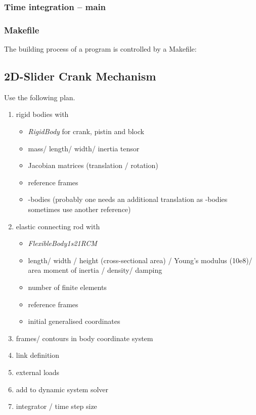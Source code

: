 \subsubsection{Time integration -- main}


\subsubsection{Makefile} \enlargethispage{5mm}
The building process of a program is controlled by a Makefile:

\subsection{2D-Slider Crank Mechanism}
Use the following plan.
\begin{enumerate}
\item rigid bodies with
\begin{itemize}
\item \emph{RigidBody} for crank, pistin and block
\item mass/ length/ width/ inertia tensor
\item Jacobian matrices (translation / rotation)
\item reference frames
\item \OpenMBV{}-bodies (probably one needs an additional translation as \OpenMBV{}-bodies sometimes use another reference)
\end{itemize}

\item elastic connecting rod with
\begin{itemize}
\item \emph{FlexibleBody1s21RCM}
\item length/ width / height (cross-sectional area) / Young's modulus (10e8)/ area moment of inertia / density/ damping
\item number of finite elements
\item reference frames
\item initial generalised coordinates
\end{itemize}

\item frames/ contours in body coordinate system
\item link definition
\item external loads
\item add to dynamic system solver
\item integrator / time step size
\end{enumerate}

